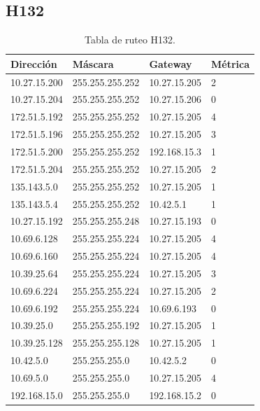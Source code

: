 \documentclass[12pt,titlepage]{article}
\begin{document}
\subsection{H132}
\begin{table}
  \begin{center}
    \begin{tabular}{|l|l|l|l|}
      \hline
        \bf{Direcci\'on} & \bf{M\'ascara} & \bf{Gateway} & \bf{M\'etrica} \\
      \hline 
	10.27.15.200  & 255.255.255.252 & 10.27.15.205 & 2 \\
        10.27.15.204  & 255.255.255.252 & 10.27.15.206 & 0 \\
        172.51.5.192  & 255.255.255.252 & 10.27.15.205 & 4 \\
        172.51.5.196  & 255.255.255.252 & 10.27.15.205 & 3 \\
        172.51.5.200  & 255.255.255.252 & 192.168.15.3 & 1 \\
        172.51.5.204  & 255.255.255.252 & 10.27.15.205 & 2 \\
        135.143.5.0   & 255.255.255.252 & 10.27.15.205 & 1 \\
        135.143.5.4   & 255.255.255.252 & 10.42.5.1 & 1 \\ 	
	10.27.15.192  & 255.255.255.248 & 10.27.15.193 & 0 \\
	10.69.6.128   & 255.255.255.224 & 10.27.15.205 & 4 \\
        10.69.6.160   & 255.255.255.224 & 10.27.15.205 & 4 \\
	10.39.25.64   & 255.255.255.224 & 10.27.15.205 & 3 \\       
	10.69.6.224   & 255.255.255.224 & 10.27.15.205 & 2 \\
	10.69.6.192   & 255.255.255.224 & 10.69.6.193 & 0 \\	
	10.39.25.0    & 255.255.255.192 & 10.27.15.205 & 1 \\
	10.39.25.128  & 255.255.255.128 & 10.27.15.205 & 1 \\
	10.42.5.0     & 255.255.255.0 & 10.42.5.2 & 0 \\
        10.69.5.0     & 255.255.255.0 & 10.27.15.205 & 4 \\
        192.168.15.0  & 255.255.255.0 & 192.168.15.2 & 0 \\  
    \hline
    \end{tabular} \\
  \end{center}
  \caption{Tabla de ruteo H132.}
\end{table}
\FloatBarrier
\end{document}
